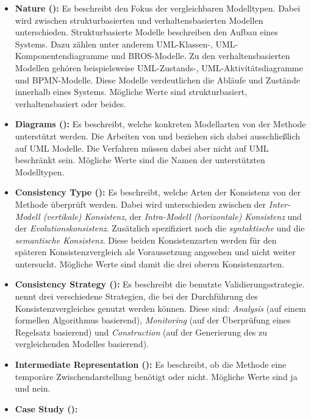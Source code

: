\begin{itemize}
    \item \textbf{Nature (\cite{Usman2008}):}
    Es beschreibt den Fokus der vergleichbaren Modelltypen.
    Dabei wird zwischen strukturbasierten und verhaltensbasierten Modellen unterschieden.
    Strukturbasierte Modelle beschreiben den Aufbau eines Systems. Dazu zählen unter anderem UML-Klassen-, UML-Komponentendiagramme und BROS-Modelle.
    Zu den verhaltensbasierten Modellen gehören beispielsweise UML-Zustands-, UML-Aktivitätsdiagramme und BPMN-Modelle.
    Diese Modelle verdeutlichen die Abläufe und Zustände innerhalb eines Systems.
    Mögliche Werte sind strukturbasiert, verhaltensbasiert oder beides.
    \item \textbf{Diagrams (\cite{Usman2008}):}
    Es beschreibt, welche konkreten Modellarten von der Methode unterstützt werden.
    Die Arbeiten von \cite{Usman2008} und \cite{Lucas2009} beziehen sich dabei ausschließlich auf UML Modelle.
    Die Verfahren müssen dabei aber nicht auf UML beschränkt sein.
    Mögliche Werte sind die Namen der unterstützten Modelltypen.
    \item \textbf{Consistency Type (\cite{Usman2008}):}
    Es beschreibt, welche Arten der Konsistenz von der Methode überprüft werden.
    Dabei wird unterschieden zwischen der \emph{Inter-Modell (vertikale) Konsistenz}, der \emph{Intra-Modell (horizontale) Konsistenz} und der \emph{Evolutionskonsistenz}.
    Zusätzlich spezifiziert \cite{Usman2008} noch die \emph{syntaktische} und die \emph{semantische Konsistenz}.
    Diese beiden Konsistenzarten werden für den späteren Konsistenzvergleich als Voraussetzung angesehen und nicht weiter untersucht.
    Mögliche Werte sind damit die drei oberen Konsistenzarten.
    \item \textbf{Consistency Strategy (\cite{Usman2008}):}
    Es beschreibt die benutzte Validierungsstrategie.
    \cite{Usman2008} nennt drei verschiedene Strategien, die bei der Durchführung des Konsistenzvergleiches genutzt werden können.
    Diese sind: \emph{Analysis} (auf einem formellen Algorithmus basierend), \emph{Monitoring} (auf der Überprüfung eines Regelsatz basierend) und \emph{Construction} (auf der Generierung des zu vergleichenden Modelles basierend).
    \item \textbf{Intermediate Representation (\cite{Usman2008}):}
    Es beschreibt, ob die Methode eine temporäre Zwischendarstellung benötigt oder nicht.
    Mögliche Werte sind ja und nein. 
    \item \textbf{Case Study (\cite{Usman2008}):}

\end{itemize}
